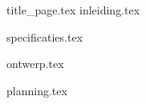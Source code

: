 \documentclass[final]{scrreprt}
\date{22 november 2013}
\begin{document}

{title_page.tex}
{inleiding.tex}
\newpage

\tableofcontents

\newpage
{}

{specificaties.tex}

{ontwerp.tex}

{planning.tex}

\newpage
{}

\printbibliography
\end{document}
